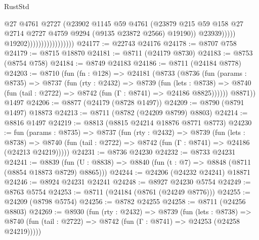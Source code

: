 \begin{lexlean}{RustStd}
\begin{coremodule}
                                                @27
                                                @4761
                                                @2727
                                                (@23902
                                                  @1145
                                                  @59
                                                  @4761
                                                  (@23879
                                                    @215
                                                    @59
                                                    @158
                                                    @27
                                                    @2714
                                                    @2727
                                                    @4759
                                                    @9294
                                                    (@9135 @23872 @2566)
                                                    @19190))
                                                @23939)))))
                                      @19202)))))))))))))))))
@24177 := @22743 @24176
@24178 := @8707 @758
@24179 := @8715 @18870
@24181 := @8711 (@24179 @8730)
@24183 := @8753 (@8754 @758)
@24184 := @8749 @24183
@24186 := @8711 (@24184 @8778)
@24203 := @8710
    (fun (fn : @128) =>
    @24181
      (@8733
        (@8736
          (fun (params : @8735) =>
          @8737
            (fun (rty : @2432) =>
            @8739
              (fun (lets : @8738) =>
              @8740 (fun (tail : @2722) => @8742 (fun (Γ : @8741) => @24186 @8825))))))
        @8871))
    @1497
@24206 := @8877 (@24179 (@8728 @1497))
@24209 := @8790 (@8791 @1497) @18873
@24213 := @8711 (@8782 (@24209 @8799) @8803)
@24214 := @8816 @1497
@24219 := @8813 (@8815 @24214 @18876 @8771 @8773)
@24230 := fun (params : @8735) =>
  @8737
    (fun (rty : @2432) =>
    @8739
      (fun (lets : @8738) =>
      @8740 (fun (tail : @2722) => @8742 (fun (Γ : @8741) => @24186 (@24213 @24219)))))
@24231 := @8736 @24230
@24232 := @8733 @24231
@24241 := @8839
    (fun (U : @8838) => @8840 (fun (t : @7) => @8848 (@8711 (@8854 @18873 @8729) @8865)))
@24244 := @24206 (@24232 @24241) @18871
@24246 := @8924 @24231 @24241
@24248 := @8927 @24230 @5754
@24249 := @8763 @5754
@24253 := @8711 (@24184 (@8761 (@24249 @8776)))
@24255 := @24209 (@8798 @5754)
@24256 := @8782 @24255
@24258 := @8711 (@24256 @8803)
@24269 := @8930
    (fun (rty : @2432) =>
    @8739
      (fun (lets : @8738) =>
      @8740 (fun (tail : @2722) => @8742 (fun (Γ : @8741) => @24253 (@24258 @24219)))))

\end{coremodule}
\end{lexlean}
